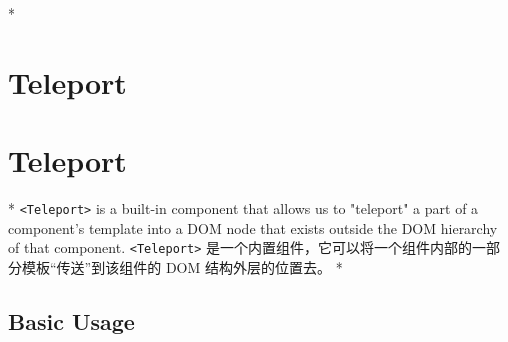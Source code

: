 \begin{paracol}{2}
\switchcolumn[0]*%
\section{Teleport}
\switchcolumn
\section{Teleport}
\switchcolumn[0]*%
\texttt{\textless{}Teleport\textgreater{}} is a built-in component that
allows us to "teleport" a part of a component's template into a DOM node
that exists outside the DOM hierarchy of that component.
\switchcolumn
\texttt{\textless{}Teleport\textgreater{}}
是一个内置组件，它可以将一个组件内部的一部分模板``传送''到该组件的 DOM
结构外层的位置去。
\switchcolumn[0]*%
\subsection{Basic Usage}
\switchcolumn

\end{paracol}
